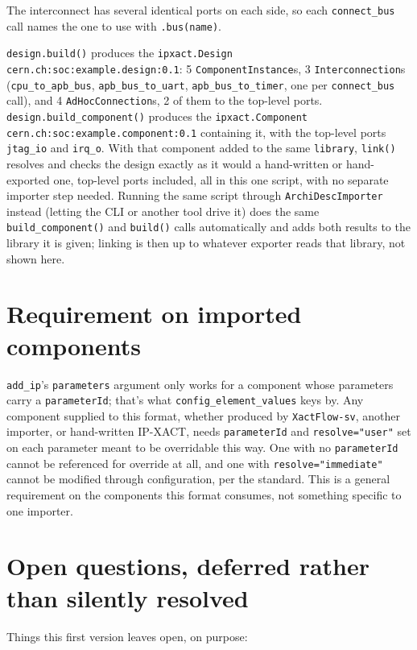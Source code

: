\documentclass[11pt]{article}
\newcommand{\code}[1]{\texttt{#1}}
\begin{document}
The interconnect has several identical ports on each side, so each
\code{connect\_bus} call names the one to use with \code{.bus(name)}.

\code{design.build()} produces the \code{ipxact.Design}
\code{cern.ch:soc:example.design:0.1}: 5 \code{ComponentInstance}s, 3
\code{Interconnection}s (\code{cpu\_to\_apb\_bus}, \code{apb\_bus\_to\_uart},
\code{apb\_bus\_to\_timer}, one per \code{connect\_bus} call), and 4
\code{AdHocConnection}s, 2 of them to the top-level ports. \code{design.build\_component()}
produces the \code{ipxact.Component} \code{cern.ch:soc:example.component:0.1} containing
it, with the top-level ports \code{jtag\_io} and \code{irq\_o}. With that component added
to the same \code{library}, \code{link()} resolves and checks the design exactly as it
would a hand-written or hand-exported one, top-level ports included, all in this one
script, with no separate importer step needed. Running the same script through
\code{ArchiDescImporter} instead (letting the CLI or another tool drive it) does the same
\code{build\_component()} and \code{build()} calls automatically and adds both results to
the library it is given; linking is then up to whatever exporter reads that library, not
shown here.

\section{Requirement on imported components}
\label{sec:relationship-sv}

\code{add\_ip}'s \code{parameters} argument only works for a component whose parameters
carry a \code{parameterId}; that's what \code{config\_element\_values} keys by. Any
component supplied to this format, whether produced by \code{XactFlow-sv}, another
importer, or hand-written IP-XACT, needs \code{parameterId} and \code{resolve="user"} set
on each parameter meant to be overridable this way. One with no \code{parameterId} cannot
be referenced for override at all, and one with \code{resolve="immediate"} cannot be
modified through configuration, per the standard. This is a general requirement on the
components this format consumes, not something specific to one importer.

\section{Open questions, deferred rather than silently resolved}
\label{sec:open-questions}

Things this first version leaves open, on purpose:
\end{document}
